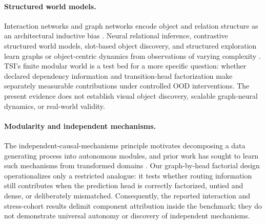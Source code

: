\paragraph{Structured world models.}
Interaction networks and graph networks encode object and relation structure
as an architectural inductive bias
\citep{battaglia2016interaction,battaglia2018relational}.  Neural relational
inference, contrastive structured world models, slot-based object discovery,
and structured exploration learn graphs or object-centric dynamics from
observations of varying complexity
\citep{kipf2018nri,kipf2020contrastive,locatello2020slot,
sancaktar2022curious}.  TSI's finite modular world is a test bed for a more
specific question: whether declared dependency information and transition-head
factorization make separately measurable contributions under controlled OOD
interventions.  The present evidence does not establish visual object
discovery, scalable graph-neural dynamics, or real-world validity.

\paragraph{Modularity and independent mechanisms.}
The independent-causal-mechanisms principle motivates decomposing a data
generating process into autonomous modules, and prior work has sought to learn
such mechanisms from transformed domains \citep{parascandolo2018independent}.
Our graph-by-head factorial design operationalizes only a restricted analogue:
it tests whether routing information still contributes when the prediction
head is correctly factorized, untied and dense, or deliberately mismatched.
Consequently, the reported interaction and stress-cohort results delimit
component attribution inside the benchmark; they do not demonstrate universal
autonomy or discovery of independent mechanisms.
